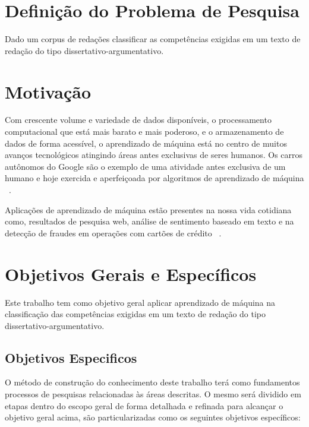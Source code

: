 \section{Definição do Problema de Pesquisa}

Dado um corpus de redações classificar as competências exigidas em um texto de redação do tipo dissertativo-argumentativo.

\section{Motivação}

Com crescente volume e variedade de dados disponíveis, o processamento computacional que está mais barato e mais poderoso, e o armazenamento de dados de forma acessível, o aprendizado de máquina está no centro de muitos avanços tecnológicos atingindo áreas antes exclusivas de seres humanos. Os carros autônomos do Google são o exemplo de uma atividade antes exclusiva de um humano e hoje exercida e aperfeiçoada por algoritmos de aprendizado de máquina ~\cite{waymo:2017}.

Aplicações de aprendizado de máquina estão presentes na nossa vida cotidiana como, resultados de pesquisa web, análise de sentimento baseado em texto e na detecção de fraudes em operações com cartões de crédito ~\cite{batista1999aplicando}.

\section{Objetivos Gerais e Específicos}

Este trabalho tem como objetivo geral aplicar aprendizado de máquina na classificação das competências exigidas em um texto de redação do tipo dissertativo-argumentativo.

\subsection{Objetivos Especificos}

O método de construção do conhecimento deste trabalho terá como fundamentos processos de pesquisas relacionadas às áreas descritas. O mesmo será dividido em etapas dentro do escopo geral de forma detalhada e refinada para alcançar o objetivo geral acima, são particularizadas como os seguintes objetivos específicos:

